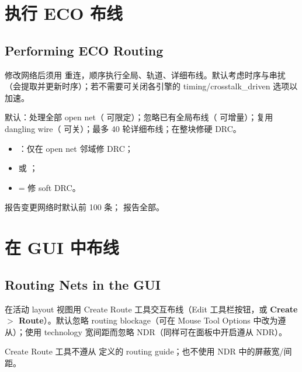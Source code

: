 \section{执行 ECO 布线}
\subsection*{Performing ECO Routing}

修改网络后须用  重连，顺序执行全局、轨道、详细布线。默认考虑时序与串扰（会提取并更新时序）；若不需要可关闭各引擎的 timing/crosstalk\_driven 选项以加速。

默认：处理全部 open net（ 可限定）；忽略已有全局布线（ 可增量）；复用 dangling wire（ 可关）；最多 40 轮详细布线；在整块修硬 DRC。

\begin{itemize}
  \item {}：仅在 open net 邻域修 DRC；
  \item {} 或 ；
  \item {}= 修 soft DRC。
\end{itemize}

报告变更网络时默认前 100 条； 报告全部。

\section{在 GUI 中布线}
\subsection*{Routing Nets in the GUI}

在活动 layout 视图用 Create Route 工具交互布线（Edit 工具栏按钮，或 \textbf{Create $>$ Route}）。默认忽略 routing blockage（可在 Mouse Tool Options 中改为遵从）；使用 technology 宽间距而忽略 NDR（同样可在面板中开启遵从 NDR）。

\begin{noteBox}
Create Route 工具不遵从  定义的 routing guide；也不使用 NDR 中的屏蔽宽/间距。
\end{noteBox}

